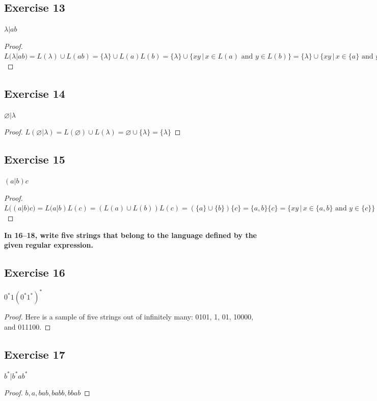 \documentclass[14pt]{extarticle}
\newcommand{\es}{\varnothing}
\newcommand{\cy}{\color{cyan}}
\begin{document}
\subsection{Exercise 13}
\(\lambda | ab\)

\begin{proof}
\(L(\lambda | ab) = L(\lambda) \cup L(ab) = \{\lambda\} \cup L(a)L(b) = \{\lambda\} \cup \{xy \,|\, x \in L(a) \text{ and } 
y \in L(b)\} = \{\lambda\} \cup \{xy \,|\, x \in \{a\} \text{ and } y \in \{b\}\} = \{\lambda\} \cup \{ab\} = 
\{\lambda, ab\}\)
\end{proof}

\subsection{Exercise 14}
\(\es | \lambda\)

\begin{proof}
\(L(\es | \lambda) = L(\es) \cup L(\lambda) = \es \cup \{\lambda\} = \{\lambda\}\)
\end{proof}

\subsection{Exercise 15}
\((a | b)c\)

\begin{proof}
\(L((a | b)c) = L(a|b)L(c) = (L(a) \cup L(b))L(c) = (\{a\} \cup \{b\})\{c\} = \{a,b\}\{c\} = \{xy \, | \, x \in \{a,b\} 
\text{ and } y \in \{c\}\} = \{ac, bc\}\)
\end{proof}

{\bf \cy In 16–18, write five strings that belong to the language defined by the given regular expression.}

\subsection{Exercise 16}
\(0^*1(0^*1^*)^*\)

\begin{proof}
Here is a sample of five strings out of infinitely many: 0101, 1, 01, 10000, and 011100.
\end{proof}

\subsection{Exercise 17}
\(b^* | b^*ab^*\)

\begin{proof}
\(b, a, bab, babb, bbab\)
\end{proof}
\end{document}
